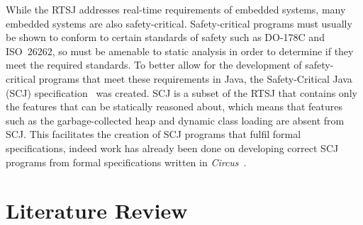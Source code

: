 \documentclass[a4paper,12pt]{article}
\newcommand{\Circus}{{\sffamily \slshape Circus}}
\begin{document}
While the RTSJ addresses real-time requirements of embedded systems, many embedded systems are also safety-critical.
Safety-critical programs must usually be shown to conform to certain standards of safety such as \mbox{DO-178C} and ISO~26262, so must be amenable to static analysis in order to determine if they meet the required standards.
To better allow for the development of safety-critical programs that meet these requirements in Java, the Safety-Critical Java (SCJ) specification~\cite{locke2013} was created.
SCJ is a subset of the RTSJ that contains only the features that can be statically reasoned about, which means that features such as the garbage-collected heap and dynamic class loading are absent from SCJ.
This facilitates the creation of SCJ programs that fulfil formal specifications, indeed work has already been done on developing correct SCJ programs from formal specifications written in \Circus~\cite{cavalcanti2011, cavalcanti2013}.



\section{Literature Review}
\end{document}
